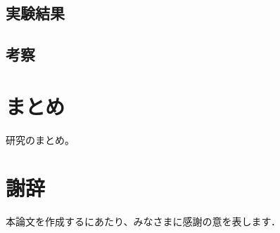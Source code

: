 \documentclass[11pt,a4j]{jreport}
\begin{document}
\section{実験結果}
\section{考察}

\chapter{まとめ}
研究のまとめ。

\chapter*{謝辞} %
本論文を作成するにあたり、みなさまに感謝の意を表します．


\renewcommand{\bibname}{参考文献} %
\end{document}
